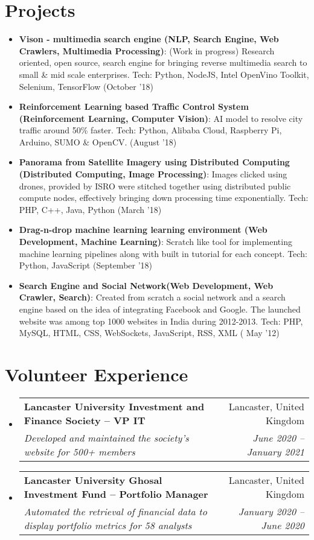 \documentclass[a4paper,20pt]{article}
\makeatletter
\newcommand{\resumeItem}[2]{
  \item\small{
    \textbf{#1}{: #2 \vspace{-2pt}}
  }
}
\newcommand{\resumeSubheading}[4]{
  \vspace{-1pt}\item
    \begin{tabular*}{0.97\textwidth}{l@{\extracolsep{\fill}}r}
      \textbf{#1} & #2 \\
      \textit{#3} & \textit{#4} \\
    \end{tabular*}\vspace{-5pt}
}
\newcommand{\resumeSubItem}[2]{\resumeItem{#1}{#2}\vspace{-3pt}}
\newcommand{\resumeSubHeadingListStart}{\begin{itemize}[leftmargin=*]}
\newcommand{\resumeSubHeadingListEnd}{\end{itemize}}
\makeatother
\begin{document}

\vspace{-5pt}
\section{Projects}
\resumeSubHeadingListStart
\resumeSubItem{Vison - multimedia search engine (NLP, Search Engine, Web Crawlers, Multimedia Processing)}{(Work in progress) Research oriented, open source, search engine for bringing reverse multimedia search to small \& mid scale enterprises. Tech: Python, NodeJS, Intel OpenVino Toolkit, Selenium, TensorFlow (October '18)}
\vspace{2pt}
\resumeSubItem{Reinforcement Learning based Traffic Control System (Reinforcement Learning, Computer Vision)}{AI model to resolve city traffic around 50\%
faster. Tech: Python, Alibaba Cloud, Raspberry Pi, Arduino, SUMO \& OpenCV. (August '18)}
\vspace{2pt}
\resumeSubItem{Panorama from Satellite Imagery using Distributed Computing (Distributed Computing, Image Processing)}{Images clicked using drones, provided by ISRO were stitched together using distributed public compute nodes, effectively bringing down processing time exponentially. Tech: PHP, C++, Java, Python (March '18)}
\vspace{2pt}
\resumeSubItem{Drag-n-drop machine learning learning environment (Web Development, Machine Learning)}{Scratch like tool for implementing machine learning pipelines along with built in tutorial for each concept. Tech: Python, JavaScript (September '18)}
\vspace{2pt}
\resumeSubItem{Search Engine and Social Network(Web Development, Web Crawler, Search)}{Created from scratch a social network and a search engine based on the idea of integrating Facebook and Google. The launched website was among top 1000 websites in India during 2012-2013. Tech: PHP, MySQL, HTML, CSS, WebSockets, JavaScript, RSS, XML ( May '12)}
\resumeSubHeadingListEnd
\vspace{-5pt}

\vspace{-5pt}
\section{Volunteer Experience}
  \resumeSubHeadingListStart
    \resumeSubheading
    {Lancaster University Investment and Finance Society – VP IT}{Lancaster, United Kingdom}
    {Developed and maintained the society's website for 500+ members}{June 2020 – January 2021}
\vspace{5pt}
    \resumeSubheading
    {Lancaster University Ghosal Investment Fund – Portfolio Manager}{Lancaster, United Kingdom}
    {Automated the retrieval of financial data to display portfolio metrics for 58 analysts}{January 2020 – June 2020}

\resumeSubHeadingListEnd
\end{document}

